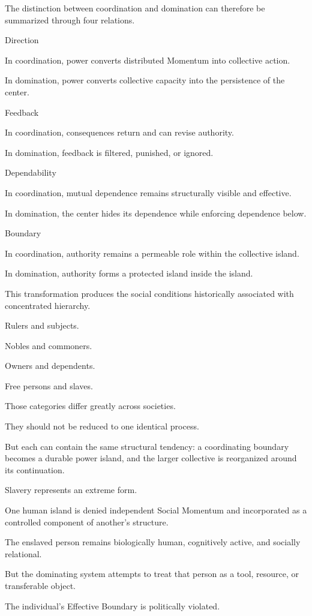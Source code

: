 The distinction between coordination and domination can therefore be summarized through four relations.

Direction

In coordination, power converts distributed Momentum into collective action.

In domination, power converts collective capacity into the persistence of the center.

Feedback

In coordination, consequences return and can revise authority.

In domination, feedback is filtered, punished, or ignored.

Dependability

In coordination, mutual dependence remains structurally visible and effective.

In domination, the center hides its dependence while enforcing dependence below.

Boundary

In coordination, authority remains a permeable role within the collective island.

In domination, authority forms a protected island inside the island.

This transformation produces the social conditions historically associated with concentrated hierarchy.

Rulers and subjects.

Nobles and commoners.

Owners and dependents.

Free persons and slaves.

Those categories differ greatly across societies.

They should not be reduced to one identical process.

But each can contain the same structural tendency: a coordinating boundary becomes a durable power island, and the larger collective is reorganized around its continuation.

Slavery represents an extreme form.

One human island is denied independent Social Momentum and incorporated as a controlled component of another’s structure.

The enslaved person remains biologically human, cognitively active, and socially relational.

But the dominating system attempts to treat that person as a tool, resource, or transferable object.

The individual’s Effective Boundary is politically violated.


